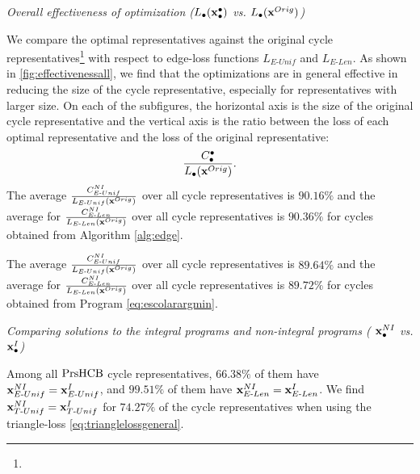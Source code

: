 \noindent \emph{Overall effectiveness of optimization ($L_\bullet(\mathbf{x}_\bullet^\bullet)$ vs. $L_\bullet(\mathbf{x}^{Orig})$)} 

We compare the optimal representatives against the original cycle representatives\DIFaddbegin \footnote{} \DIFaddend with respect to edge-loss functions $L_{E\text{-}Unif}$ and $L_{E\text{-}Len}$. As shown in \fig \ref{fig:effectivenessall}, we find that the optimizations are in general effective in reducing the size of the cycle representative, especially for representatives with larger size. On each of the subfigures, the horizontal axis is the size of the original cycle representative and the vertical axis is the ratio between the loss of each optimal representative and the loss of the original representative:
$$\frac{C^\bullet_\bullet}{L_\bullet(\mathbf{x}^{Orig})}.$$ 
The average $\frac{C^{NI}_{E\text{-}Unif}}{L_{E\text{-}Unif}(\mathbf{x}^{Orig})}$ over all cycle representatives is $90.16\%$ and the average for $\frac{C^{NI}_{E\text{-}Len}}{L_{E\text{-}Len}(\mathbf{x}^{Orig})}$ over all cycle representatives is $90.36\%$ for cycles obtained from Algorithm \ref{alg:edge}.

The average $\frac{C^{NI}_{E\text{-}Unif}}{L_{E\text{-}Unif}(\mathbf{x}^{Orig})}$ over all cycle representatives is $89.64\%$ and the average for $\frac{C^{NI}_{E\text{-}Len}}{L_{E\text{-}Len}(\mathbf{x}^{Orig})}$ over all cycle representatives is $89.72\%$ for cycles obtained from Program \eqref{eq:escolarargmin}. \DIFdelbegin {}\DIFdelend \DIFaddbegin {}  
\DIFaddend 

\noindent \emph{Comparing solutions to the integral programs and non-integral programs ( $\mathbf{x}^{NI}_\bullet$ vs. $\mathbf{x}^{I}_{\bullet}$)}

Among all $\mathrm{PrsHCB}$ cycle representatives, $66.38\%$ of them have $\mathbf{x}^{NI}_{E\text{-}Unif} = \mathbf{x}^{I}_{E\text{-}Unif}$, and  $99.51\%$ of them have $\mathbf{x}^{NI}_{E\text{-}Len} = \mathbf{x}^{I}_{E\text{-}Len}$. We find $\mathbf{x}^{NI}_{T\text{-}Unif} = \mathbf{x}^{I}_{T\text{-}Unif}$ for $74.27\%$ of the cycle representatives when using the triangle-loss \pr \eqref{eq:trianglelossgeneral}. 


